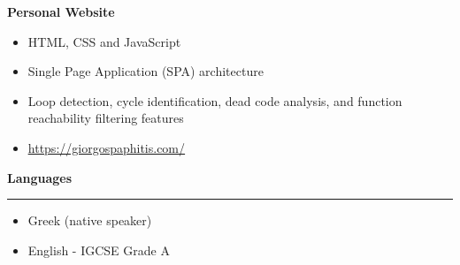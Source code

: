 \documentclass[12pt]{article}
\begin{document}
\vspace{0.5cm}
\textbf{\textcolor{bgcolor}{Personal Website}}\\[0.5em]
{\renewcommand{\labelitemi}{\textcolor{bgcolor}{\normalsize$\bullet$}}%
   \begin{itemize}[leftmargin=33pt, itemsep=0pt, topsep=0pt]
      \item HTML, CSS and JavaScript\\
      \item Single Page Application (SPA) architecture\\
      \item Loop detection, cycle identification, dead code analysis, and function reachability filtering features\\
      \item \href{https://giorgospaphitis.com/}{\underline{https://giorgospaphitis.com/}}\\
   \end{itemize}
}
\vspace{1cm}
{\fontsize{14pt}{13pt}\selectfont
   \textbf{\textcolor{bgcolor}{Languages}}\\[0.3em]
}
\hrule
\vspace{0.5cm}
{\renewcommand{\labelitemi}{\textcolor{bgcolor}{\normalsize$\bullet$}}%
   \begin{itemize}[leftmargin=13pt, itemsep=0pt, topsep=0pt]
      \item Greek (native speaker)\\
      \item English - IGCSE Grade A\\
   \end{itemize}
}
\end{document}
